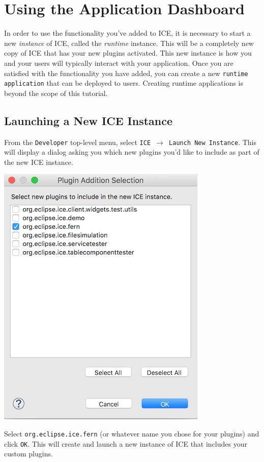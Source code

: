 \section{Using the Application Dashboard} 

In order to use the functionality you've added to ICE, it is necessary to start
a new \textit{instance} of ICE, called the \textit{runtime} instance. This will
be a completely new copy of ICE that has your new plugins activated. This new
instance is how you and your users will typically interact with your
application. Once you are satisfied with the functionality you have added, you
can create a new \texttt{runtime application} that can be deployed to users.
Creating runtime applications is beyond the scope of this tutorial.

\subsection{Launching a New ICE Instance}

From the \texttt{Developer} top-level menu, select \texttt{ICE $\rightarrow$ Launch New Instance}. This will display a
dialog asking you which new plugins you'd like to include as part of the new ICE instance. 
\begin{center} \includegraphics{figures/pluginDialog}
\end{center}
Select \texttt{org.eclipse.ice.fern} (or whatever name you chose for your
plugins) and click \texttt{OK}.
This will create and launch a new instance of ICE that includes your custom
plugins.

